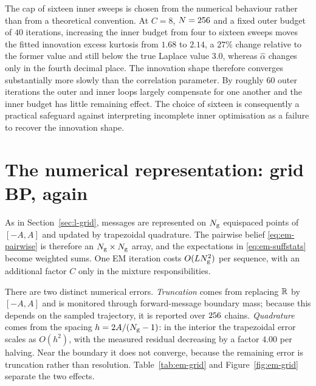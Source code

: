 \begin{remark}\label{rmk:em-inner}
The cap of sixteen inner sweeps is chosen from the numerical behaviour rather
than from a theoretical convention. At $C=8$, $N=256$ and a fixed outer
budget of $40$ iterations, increasing the inner budget from four to sixteen
sweeps moves the fitted innovation excess kurtosis from $1.68$ to $2.14$, a
$27\%$ change relative to the former value and still below the true Laplace
value $3.0$, whereas $\widehat\alpha$ changes only in the fourth decimal
place. The innovation shape therefore converges substantially more slowly than
the correlation parameter. By roughly $60$ outer iterations the outer and
inner loops largely compensate for one another and the inner budget has little
remaining effect. The choice of sixteen is consequently a practical safeguard
against interpreting incomplete inner optimisation as a failure to recover the
innovation shape.
\end{remark}


\section{The numerical representation: grid BP, again}
\label{sec:em-numerical}

As in Section~\ref{sec:l-grid}, messages are represented on $N_{\mathrm{g}}$
equispaced points of $[-A,A]$ and updated by trapezoidal quadrature. The
pairwise belief \eqref{eq:em-pairwise} is therefore an
$N_{\mathrm{g}}\times N_{\mathrm{g}}$ array, and the expectations in
\eqref{eq:em-suffstats} become weighted sums. One EM iteration costs
$O(LN_{\mathrm{g}}^2)$ per sequence, with an additional factor $C$ only in the
mixture responsibilities.

There are two distinct numerical errors. \emph{Truncation} comes from replacing
$\mathbb{R}$ by $[-A,A]$ and is monitored through forward-message boundary mass;
because this depends on the sampled trajectory, it is reported over
$256$ chains. \emph{Quadrature} comes from the spacing
$h=2A/(N_{\mathrm{g}}-1)$: in the interior the trapezoidal error scales as $O(h^2)$,
with the measured residual decreasing by a factor $4.00$ per halving. Near the
boundary it does not converge, because the remaining error is truncation rather
than resolution. Table~\ref{tab:em-grid} and Figure~\ref{fig:em-grid} separate
the two effects.

